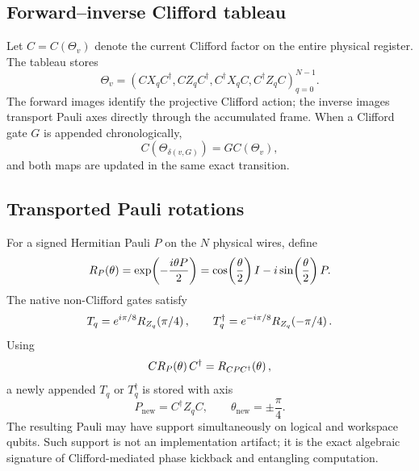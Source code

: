 \subsection{Forward--inverse Clifford tableau}

Let $C=C(\Theta_v)$ denote the current Clifford factor on the entire physical register. The tableau stores
\begin{equation}
\Theta_v=
\left(
CX_qC^\dagger,
CZ_qC^\dagger,
C^\dagger X_qC,
C^\dagger Z_qC
\right)_{q=0}^{N-1}.
\label{eq:tableau}
\end{equation}
The forward images identify the projective Clifford action; the inverse images transport Pauli axes directly through the accumulated frame. When a Clifford gate $G$ is appended chronologically,
\begin{equation}
C(\Theta_{\delta(v,G)})=GC(\Theta_v),
\label{eq:clifford-update}
\end{equation}
and both maps are updated in the same exact transition.

\subsection{Transported Pauli rotations}

For a signed Hermitian Pauli $P$ on the $N$ physical wires, define
\begin{equation}
R_{P}\!\left(\theta\right)
=\exp\!\left(-\frac{i\theta P}{2}\right)
=\cos\!\left(\frac{\theta}{2}\right)I
-i\sin\!\left(\frac{\theta}{2}\right)P.
\label{eq:pauli-rotation}
\end{equation}
The native non-Clifford gates satisfy
\begin{equation}
T_q=e^{i\pi/8}R_{Z_q}\!\left(\pi/4\right),
\qquad
T_q^\dagger=e^{-i\pi/8}R_{Z_q}\!\left(-\pi/4\right).
\label{eq:t-rotation}
\end{equation}
Using
\begin{equation}
CR_{P}\!\left(\theta\right)C^\dagger
=R_{CPC^\dagger}\!\left(\theta\right),
\label{eq:clifford-conjugation}
\end{equation}
a newly appended $T_q$ or $T_q^\dagger$ is stored with axis
\begin{equation}
P_{\mathrm{new}}=C^\dagger Z_qC,
\qquad
\theta_{\mathrm{new}}=\pm\frac{\pi}{4}.
\label{eq:transported-axis}
\end{equation}
The resulting Pauli may have support simultaneously on logical and workspace qubits. Such support is not an implementation artifact; it is the exact algebraic signature of Clifford-mediated phase kickback and entangling computation.

